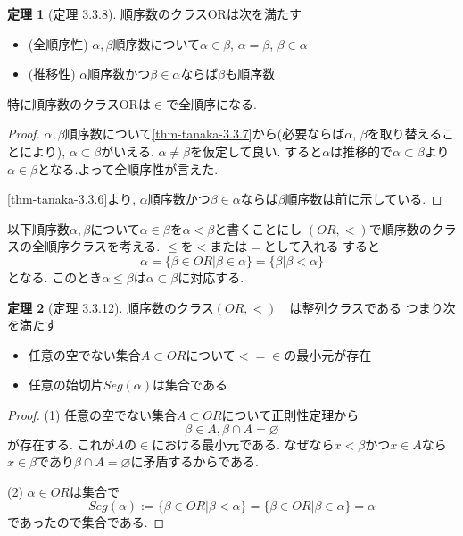 \documentclass[dvipdfmx,a4paper,11pt]{article}
\theoremstyle{definition}
\newtheorem{thm}{定理}
\begin{document}
 \begin{tcolorbox}
 [colback = white, colframe = green!35!black, fonttitle = \bfseries,breakable = true]
\begin{thm}[定理 3.3.8]
順序数のクラスORは次を満たす
\begin{itemize}
\item(全順序性) $\alpha, \beta$順序数について$\alpha \in \beta$, $\alpha = \beta$, $\beta \in \alpha$
\item (推移性) $\alpha$順序数かつ$\beta \in \alpha$ならば$\beta$も順序数
\end{itemize}
特に順序数のクラスORは$\in$で全順序になる. 
\end{thm}
\end{tcolorbox}

\begin{proof}
$\alpha, \beta$順序数について\ref{thm-tanaka-3.3.7}から(必要ならば$\alpha$, $\beta$を取り替えることにより), $\alpha \subset \beta$がいえる. $\alpha \neq \beta$を仮定して良い.
すると$\alpha$は推移的で$\alpha \subset \beta$より$\alpha \in \beta$となる.よって全順序性が言えた.

\ref{thm-tanaka-3.3.6}より,  $\alpha$順序数かつ$\beta \in \alpha$ならば$\beta$順序数は前に示している. 
\end{proof}

以下順序数$\alpha, \beta$について$\alpha \in \beta$を$\alpha < \beta$と書くことにし
$(OR, <)$で順序数のクラスの全順序クラスを考える.
$\le$を$<$または$=$として入れる
すると
$$
\alpha
=
\{\beta \in OR | \beta \in \alpha \}
=
\{ \beta | \beta< \alpha\}
$$
となる.
このとき$\alpha \le \beta$は$\alpha \subset \beta$に対応する. 

 \begin{tcolorbox}
 [colback = white, colframe = green!35!black, fonttitle = \bfseries,breakable = true]
\begin{thm}[定理 3.3.12]
順序数のクラス$(OR, <)$　は整列クラスである
つまり次を満たす
\begin{itemize}
\item 任意の空でない集合$A \subset OR$について$< = \in$の最小元が存在
\item 任意の始切片$Seg(\alpha)$は集合である
\end{itemize}
\end{thm}
\end{tcolorbox}

\begin{proof}
(1) 任意の空でない集合$A \subset OR$について正則性定理から
$$
\beta \in A, \beta \cap A = \varnothing
$$
が存在する. 
これが$A$の$\in$における最小元である. 
なぜなら$x < \beta$かつ$x \in A$なら$x \in \beta$であり$\beta \cap A = \varnothing$に矛盾するからである.

(2) $\alpha \in OR$は集合で
$$Seg(\alpha):= \{ \beta \in OR | \beta < \alpha\}
=
 \{ \beta \in OR | \beta \in  \alpha\}
= \alpha
$$であったので集合である.
\end{proof}
\end{document}
